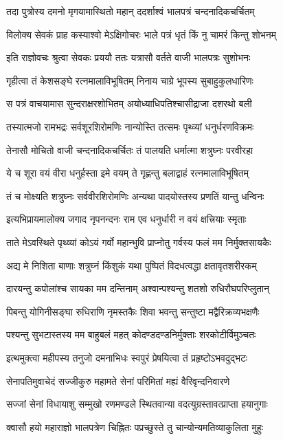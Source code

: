 \twolineshloka
{तदा पुत्रोस्य दमनो मृगयामास्थितो महान्}
{ददर्शाश्वं भालपत्रं चन्दनादिकचर्चितम्}%

\twolineshloka
{विलोक्य सेवकं प्राह कस्याश्वो मेऽक्षिगोचरः}
{भाले पत्रं धृतं किं नु चामरं किन्तु शोभनम्}%

\twolineshloka
{इति राज्ञोवचः श्रुत्वा सेवकः प्रययौ ततः}
{यत्रासौ वर्तते वाजी भालपत्रः सुशोभनः}%

\twolineshloka
{गृहीत्वा तं केशसङ्घे रत्नमालाविभूषितम्}
{निनाय चाग्रे भूपस्य सुबाहुकुलधारिणः}%

\twolineshloka
{स पत्रं वाचयामास सुन्दराक्षरशोभितम्}
{अयोध्याधिपतिश्चासीद्राजा दशरथो बली}%

\twolineshloka
{तस्यात्मजो रामभद्रः सर्वशूरशिरोमणिः}
{नान्योस्ति तत्समः पृथ्व्यां धनुर्धरणविक्रमः}%

\twolineshloka
{तेनासौ मोचितो वाजी चन्दनादिकचर्चितः}
{तं पालयति धर्मात्मा शत्रुघ्नः परवीरहा}%

\twolineshloka
{ये च शूरा वयं वीरा धनुर्हस्ता इमे वयम्}
{ते गृह्णन्तु बलाद्वाहं रत्नमालाविभूषितम्}%

\twolineshloka
{तं च मोक्ष्यति शत्रुघ्नः सर्ववीरशिरोमणिः}
{अन्यथा पादयोस्तस्य प्रणतिं यान्तु धन्विनः}%

\twolineshloka
{इत्यभिप्रायमालोक्य जगाद नृपनन्दनः}
{राम एव धनुर्धारी न वयं क्षत्त्रियाः स्मृताः}%

\twolineshloka
{ताते मेऽवस्थिते पृथ्व्यां कोऽयं गर्वो महान्भुवि}
{प्राप्नोतु गर्वस्य फलं मम निर्मुक्तसायकैः}%

\twolineshloka
{अद्य मे निशिता बाणाः शत्रुघ्नं किंशुकं यथा}
{पुष्पितं विदधत्वद्धा क्षतावृतशरीरकम्}%

\twolineshloka
{दारयन्तु कपोलांश्च सायका मम दन्तिनाम्}
{अश्वान्पश्यन्तु शतशो रुधिरौघपरिप्लुतान्}%

\twolineshloka
{पिबन्तु योगिनीसङ्घा रुधिराणि नृमस्तकैः}
{शिवा भवन्तु सन्तुष्टा मद्वैरिक्रव्यभक्षणैः}%

\twolineshloka
{पश्यन्तु सुभटास्तस्य मम बाहुबलं महत्}
{कोदण्डदण्डनिर्मुक्ताः शरकोटीर्विमुञ्चतः}%

\twolineshloka
{इत्थमुक्त्वा महीपस्य तनुजो दमनाभिधः}
{स्वपुरं प्रेषयित्वा तं प्रहृष्टोऽभवदुद्भटः}%

\twolineshloka
{सेनापतिमुवाचेदं सज्जीकुरु महामते}
{सेनां परिमितां मह्यं वैरिवृन्दनिवारणे}%

\twolineshloka
{सज्जां सेनां विधायाशु सम्मुखो रणमण्डले}
{स्थितवान्या वदत्युग्रस्तावत्प्राप्ता हयानुगाः}%

\twolineshloka
{क्वासौ हयो महाराज्ञो भालपत्रेण चिह्नितः}
{पप्रच्छुस्ते तु चान्योन्यमतिव्याकुलिता मुहुः}%

